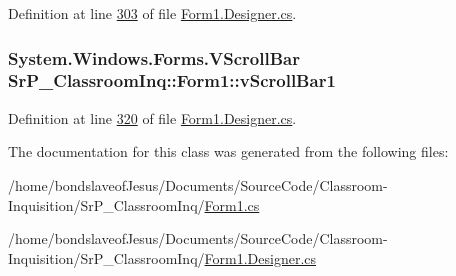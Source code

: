 \-Definition at line \hyperlink{_form1_8_designer_8cs_source_l00303}{303} of file \hyperlink{_form1_8_designer_8cs_source}{\-Form1.\-Designer.\-cs}.

\hypertarget{class_sr_p___classroom_inq_1_1_form1_a782e2e05e0a099a77a85c00d4189c762}{
\subsubsection[{v\-Scroll\-Bar1}]{\setlength{\rightskip}{0pt plus 5cm}\-System.\-Windows.\-Forms.\-V\-Scroll\-Bar {\bf \-Sr\-P\-\_\-\-Classroom\-Inq\-::\-Form1\-::v\-Scroll\-Bar1}}}
\label{class_sr_p___classroom_inq_1_1_form1_a782e2e05e0a099a77a85c00d4189c762}


\-Definition at line \hyperlink{_form1_8_designer_8cs_source_l00320}{320} of file \hyperlink{_form1_8_designer_8cs_source}{\-Form1.\-Designer.\-cs}.



\-The documentation for this class was generated from the following files\-:\begin{DoxyCompactItemize}
\item 
/home/bondslaveof\-Jesus/\-Documents/\-Source\-Code/\-Classroom-\/\-Inquisition/\-Sr\-P\-\_\-\-Classroom\-Inq/\hyperlink{_form1_8cs}{\-Form1.\-cs}\item 
/home/bondslaveof\-Jesus/\-Documents/\-Source\-Code/\-Classroom-\/\-Inquisition/\-Sr\-P\-\_\-\-Classroom\-Inq/\hyperlink{_form1_8_designer_8cs}{\-Form1.\-Designer.\-cs}\end{DoxyCompactItemize}
